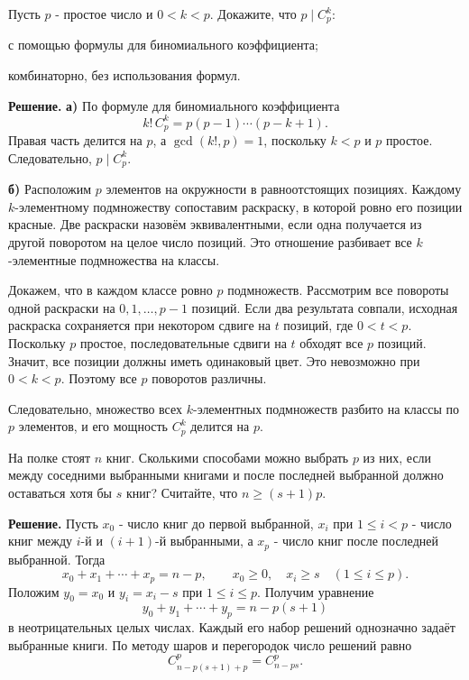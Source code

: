 \begin{problems}
\item Пусть $p$ - простое число и $0<k<p$. Докажите, что $p\mid C_p^k$:
\begin{parts}
  \item с помощью формулы для биномиального коэффициента;
  \item комбинаторно, без использования формул.
\end{parts}
\par\smallskip\noindent\textbf{Решение.} \textbf{а)} По формуле для биномиального коэффициента
\[
k!\,C_p^k=p(p-1)\cdots(p-k+1).
\]
Правая часть делится на $p$, а $\gcd(k!,p)=1$, поскольку $k<p$ и $p$ простое. Следовательно, $p\mid C_p^k$.
\par\textbf{б)} Расположим $p$ элементов на окружности в равноотстоящих позициях. Каждому $k$-элементному подмножеству сопоставим раскраску, в которой ровно его позиции красные. Две раскраски назовём эквивалентными, если одна получается из другой поворотом на целое число позиций. Это отношение разбивает все $k$-элементные подмножества на классы.
\par Докажем, что в каждом классе ровно $p$ подмножеств. Рассмотрим все повороты одной раскраски на $0,1,\ldots,p-1$ позиций. Если два результата совпали, исходная раскраска сохраняется при некотором сдвиге на $t$ позиций, где $0<t<p$. Поскольку $p$ простое, последовательные сдвиги на $t$ обходят все $p$ позиций. Значит, все позиции должны иметь одинаковый цвет. Это невозможно при $0<k<p$. Поэтому все $p$ поворотов различны.
\par Следовательно, множество всех $k$-элементных подмножеств разбито на классы по $p$ элементов, и его мощность $C_p^k$ делится на $p$.\par

\item На полке стоят $n$ книг. Сколькими способами можно выбрать $p$ из них, если между соседними выбранными книгами и после последней выбранной должно оставаться хотя бы $s$ книг? Считайте, что $n\ge(s+1)p$.
\par\smallskip\noindent\textbf{Решение.} Пусть $x_0$ - число книг до первой выбранной, $x_i$ при $1\le i<p$ - число книг между $i$-й и $(i+1)$-й выбранными, а $x_p$ - число книг после последней выбранной. Тогда
\[
x_0+x_1+\cdots+x_p=n-p,\qquad x_0\ge0,\quad x_i\ge s\quad(1\le i\le p).
\]
Положим $y_0=x_0$ и $y_i=x_i-s$ при $1\le i\le p$. Получим уравнение
\[
y_0+y_1+\cdots+y_p=n-p(s+1)
\]
в неотрицательных целых числах. Каждый его набор решений однозначно задаёт выбранные книги. По методу шаров и перегородок число решений равно
\[
C_{n-p(s+1)+p}^{p}=C_{n-ps}^{p}.
\]\par


\end{problems}
